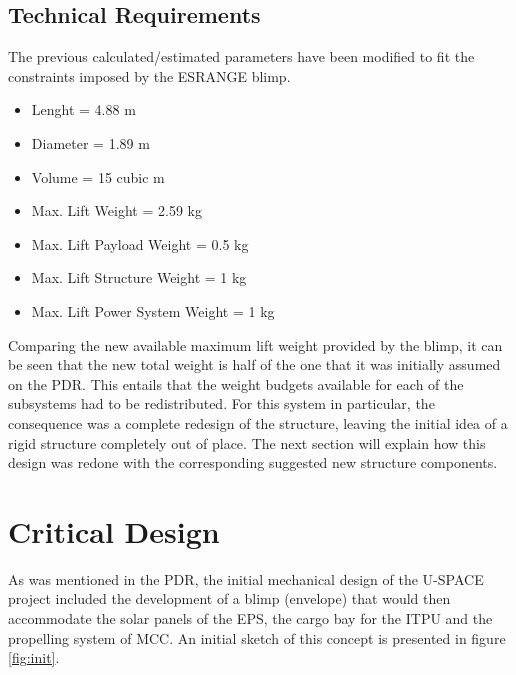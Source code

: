 \subsection{Technical Requirements}

The previous calculated/estimated parameters have been modified to fit the constraints imposed by the ESRANGE blimp. 

\begin{itemize}
\item Lenght = 4.88 m
\item Diameter = 1.89 m
\item Volume = 15 cubic m
\item Max. Lift Weight = 2.59 kg
\item Max. Lift Payload Weight = 0.5 kg
\item Max. Lift Structure Weight = 1 kg
\item Max. Lift Power System Weight = 1 kg
\end{itemize}

\noindent
Comparing the new available maximum lift weight provided by the blimp, it can be seen that the new total weight is half of the one that it was initially assumed on the \ac{PDR}. This entails that the weight budgets available for each of the subsystems had to be redistributed. For this system in particular, the consequence was a complete redesign of the structure, leaving the initial idea of a rigid structure completely out of place. The next section will explain how this design was redone with the corresponding suggested new structure components. 




\section{Critical Design}

As was mentioned in the \ac{PDR}, the initial mechanical design of the \ac{U-SPACE} project included the development of a blimp (envelope) that would then accommodate the solar panels of the \ac{EPS}, the cargo bay for the \ac{ITPU} and the propelling system of \ac{MCC}. An initial sketch of this concept is presented in figure \ref{fig:init}. 

